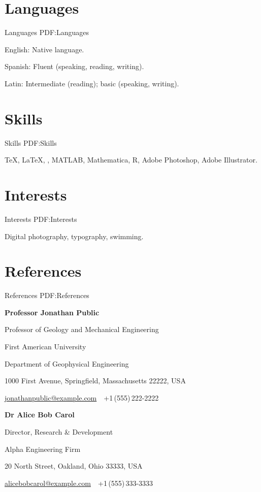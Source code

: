 \documentclass[a4paper,10pt,oneside]{article}
\begin{document}
\begin{body}

\section
{Languages}
{Languages}
{PDF:Languages}

English: Native language.
\par
Spanish: Fluent (speaking, reading, writing).
\par
Latin: Intermediate (reading); basic (speaking, writing).



\section
{Skills}
{Skills}
{PDF:Skills}

{\TeX}, {\LaTeX}, {\XeLaTeX},
MATLAB,
Mathematica,
R,
Adobe Photoshop,
Adobe Illustrator.


\section
{Interests}
{Interests}
{PDF:Interests}

Digital photography,
typography,
swimming.


\section
{References}
{References}
{PDF:References}

\textbf{Professor Jonathan Public}
\par
Professor of Geology and Mechanical Engineering
\begin{detail}
First American University
\par
Department of Geophysical Engineering
\par
1000 First Avenue, Springfield, Massachusetts 22222, USA
\par
\href{mailto:jonathanpublic@example.com}
{jonathanpublic@example.com}
\,\BulletSymbol\,
+1\,(555)\,222-2222
\end{detail}

\BigEntryGap
\textbf{Dr Alice Bob Carol}
\par
Director, Research \& Development
\begin{detail}
Alpha Engineering Firm
\par
20 North Street, Oakland, Ohio 33333, USA
\par
\href{mailto:alicebobcarol@example.com}
{alicebobcarol@example.com}
\,\BulletSymbol\,
+1\,(555)\,333-3333
\end{detail}


\end{body}
\end{document}
